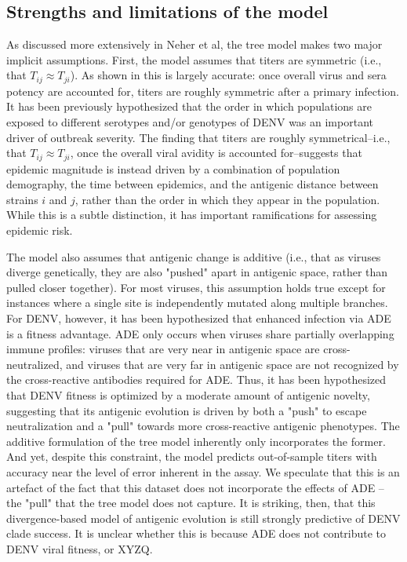 \documentclass[11pt,oneside,letterpaper]{article}
\begin{document}
\subsection*{Strengths and limitations of the model}
As discussed more extensively in Neher et al, the tree model makes two major implicit assumptions.
First, the model assumes that titers are symmetric (i.e., that $T_{ij} \approx T_{ji}$).
As shown in
this is largely accurate: once overall virus and sera potency are accounted for, titers are roughly symmetric after a primary infection.
It has been previously hypothesized that the order in which populations are exposed to different serotypes and/or genotypes of DENV was an important driver of outbreak severity.
The finding that titers are roughly symmetrical--i.e., that $T_{ij} \approx T_{ji}$, once the overall viral avidity is accounted for--suggests that epidemic magnitude is instead driven by a combination of population demography, the time between epidemics, and the antigenic distance between strains $i$ and $j$, rather than the order in which they appear in the population.
While this is a subtle distinction, it has important ramifications for assessing epidemic risk.

The model also assumes that antigenic change is additive (i.e., that as viruses diverge genetically, they are also "pushed" apart in antigenic space, rather than pulled closer together).
For most viruses, this assumption holds true except for instances where a single site is independently mutated along multiple branches.
For DENV, however, it has been hypothesized that enhanced infection via ADE is a fitness advantage.
ADE only occurs when viruses share partially overlapping immune profiles: viruses that are very near in antigenic space are cross-neutralized, and viruses that are very far in antigenic space are not recognized by the cross-reactive antibodies required for ADE.
Thus, it has been hypothesized that DENV fitness is optimized by a moderate amount of antigenic novelty, suggesting that its antigenic evolution is driven by both a "push" to escape neutralization and a "pull" towards more cross-reactive antigenic phenotypes.
The additive formulation of the tree model inherently only incorporates the former.
And yet, despite this constraint, the model predicts out-of-sample titers with accuracy near the level of error inherent in the assay.
We speculate that this is an artefact of the fact that this dataset does not incorporate the effects of ADE -- the "pull" that the tree model does not capture.
It is striking, then, that this divergence-based model of antigenic evolution is still strongly predictive of DENV clade success.
It is unclear whether this is because ADE does not contribute to DENV viral fitness, or XYZQ.
\end{document}
